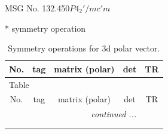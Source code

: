 \documentclass[fleqn,8pt]{jsarticle}
\begin{document}
\setcounter{MaxMatrixCols}{32}

\renewcommand{\tablename}{Table~}
\renewcommand{\figurename}{Figure~}
\begin{center}
\LARGE
MSG No. 132.450\quad$P4_{2}'/mc'm$
\end{center}
* symmetry operation
\renewcommand{\arraystretch}{1.3}
\begin{longtable}{ccccc}
\caption{Symmetry operations for 3d polar vector.}
 \\
 \hline \hline
No. & tag & matrix (polar) & det & TR \\ \hline \endfirsthead

\multicolumn{4}{l}{\tablename\ \thetable{}} \\
 \hline \hline
No. & tag & matrix (polar) & det & TR \\ \hline \endhead

 \hline \hline
\multicolumn{4}{r}{\footnotesize\it continued ...} \\ \endfoot

 \hline \hline
\multicolumn{4}{r}{} \\ \endlastfoot


\end{longtable}
\end{document}
